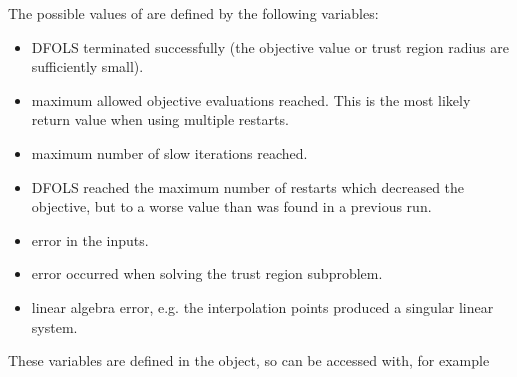 \documentclass[letterpaper,10pt,english]{sphinxmanual}
\begin{document}
The possible values of  are defined by the following variables:
\begin{itemize}
\item {} 
 \sphinxhyphen{} DFO\sphinxhyphen{}LS terminated successfully (the objective value or trust region radius are sufficiently small).

\item {} 
 \sphinxhyphen{} maximum allowed objective evaluations reached. This is the most likely return value when using multiple restarts.

\item {} 
 \sphinxhyphen{} maximum number of slow iterations reached.

\item {} 
 \sphinxhyphen{} DFO\sphinxhyphen{}LS reached the maximum number of restarts which decreased the objective, but to a worse value than was found in a previous run.

\item {} 
 \sphinxhyphen{} error in the inputs.

\item {} 
 \sphinxhyphen{} error occurred when solving the trust region subproblem.

\item {} 
 \sphinxhyphen{} linear algebra error, e.g. the interpolation points produced a singular linear system.

\end{itemize}

These variables are defined in the  object, so can be accessed with, for example
\begin{quote}

\begin{sphinxVerbatim}[commandchars=\\\{\}]
   
\end{sphinxVerbatim}
\end{quote}
\end{document}

